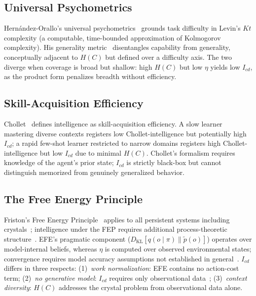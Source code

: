 \documentclass[runningheads,a4paper]{llncs}
\begin{document}
\subsection{Universal Psychometrics}
\label{sec:psychometrics}

Hern\'{a}ndez-Orallo's universal psychometrics~\cite{hernandezorallo2000beyond,hernandezorallo2010measuring,hernandezorallo2017measure} grounds task difficulty in Levin's $Kt$ complexity (a computable, time-bounded approximation of Kolmogorov complexity). His generality metric~\cite{hernandezorallo2021generality} disentangles capability from generality, conceptually adjacent to $H(C)$ but defined over a difficulty axis. The two diverge when coverage is broad but shallow: high $H(C)$ but low $\eta$ yields low $I_{cd}$, as the product form penalizes breadth without efficiency.

\subsection{Skill-Acquisition Efficiency}
\label{sec:chollet}

Chollet~\cite{chollet2019measure} defines intelligence as skill-acquisition efficiency. A slow learner mastering diverse contexts registers low Chollet-intelligence but potentially high $I_{cd}$; a rapid few-shot learner restricted to narrow domains registers high Chollet-intelligence but low $I_{cd}$ due to minimal $H(C)$. Chollet's formalism requires knowledge of the agent's prior state; $I_{cd}$ is strictly black-box but cannot distinguish memorized from genuinely generalized behavior.

\subsection{The Free Energy Principle}
\label{sec:fep}

Friston's Free Energy Principle~\cite{friston2010free,friston2015active} applies to all persistent systems including crystals~\cite{friston2012dark}; intelligence under the FEP requires additional process-theoretic structure~\cite{parr2022active}. EFE's pragmatic component ($D_{\text{KL}}[q(o\mid\pi) \| \tilde{p}(o)]$) operates over model-internal beliefs, whereas $\eta$ is computed over observed environmental states; convergence requires model accuracy assumptions not established in general~\cite{millidge2021whence}. $I_{cd}$ differs in three respects: (1)~\emph{work normalization}: EFE contains no action-cost term; (2)~\emph{no generative model}: $I_{cd}$ requires only observational data~\cite{brooks1991intelligence}; (3)~\emph{context diversity}: $H(C)$ addresses the crystal problem from observational data alone.
\end{document}
